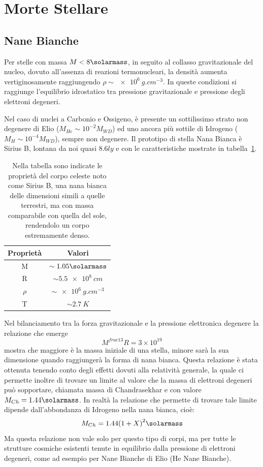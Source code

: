 \section{Morte Stellare}\label{sec:morte-stellare}
\subsection{Nane Bianche}\label{sec:nane-bianche}
Per stelle con massa $M < 8\si{\solarmass}$, in seguito al collasso gravitazionale del nucleo, dovuto all'assenza di reazioni termonucleari, la densità aumenta vertiginosamente raggiungendo $\rho \sim \SI{e6}{g.cm^{-3}}$. In queste condizioni si raggiunge l'equilibrio idrostatico tra pressione gravitazionale e pressione degli elettroni degeneri.

Nel caso di nuclei a Carbonio e Ossigeno, è presente un sottilissimo strato non degenere di Elio ($M_{He} \sim 10^{-2} M_{WD}$) ed uno ancora più sottile di Idrogeno ($M_{H} \sim 10^{-4} M_{WD}$), sempre non degenere. Il prototipo di stella Nana Bianca è Sirius B, lontana da noi quasi $8.6 \si{ly}$ e con le caratteristiche mostrate in tabella~\ref{tab:sirius-b}.

\begin{table}
    \centering
    \caption{Nella tabella sono indicate le proprietà del corpo celeste noto come Sirius B, una nana bianca delle dimensioni simili a quelle terrestri, ma con massa comparabile con quella del sole, rendendolo un corpo estremamente denso.}\label{tab:sirius-b}
    \begin{tabular}{c|c}
        \toprule
        Proprietà & Valori\\
        \midrule
        M & $\sim 1.05 \si{\solarmass}$\\
        R & $\sim \SI{5.5 e8}{cm}$\\
        $\rho$ & $\sim \SI{e6}{g.cm^{-3}}$\\
        T & $\sim \SI{2.7}{K}$\\
        \bottomrule
    \end{tabular}
\end{table}

Nel bilanciamento tra la forza gravitazionale e la pressione elettronica degenere la relazione che emerge
\[
    M^{frac{1}{3}}R = 3\times 10^{19}
\]
mostra che maggiore è la massa iniziale di una stella, minore sarà la sua dimensione quando raggiungerà la forma di nana bianca. Questa relazione è stata ottenuta tenendo conto degli effetti dovuti alla relatività generale, la quale ci permette inoltre di trovare un limite al valore che la massa di elettroni degeneri può sopportare, chiamata massa di Chandrasekhar e con valore $M_{Ch} = 1.44\si{\solarmass}$. In realtà la relazione che permette di trovare tale limite dipende dall'abbondanza di Idrogeno nella nana bianca, cioè:
\[
    M_{Ch} = 1.44{(1+X)}^2 \si{\solarmass}
\]
Ma questa relazione non vale solo per questo tipo di corpi, ma per tutte le strutture cosmiche esistenti tenute in equilibrio dalla pressione di elettroni degeneri, come ad esempio per Nane Bianche di Elio (He Nane Bianche).


